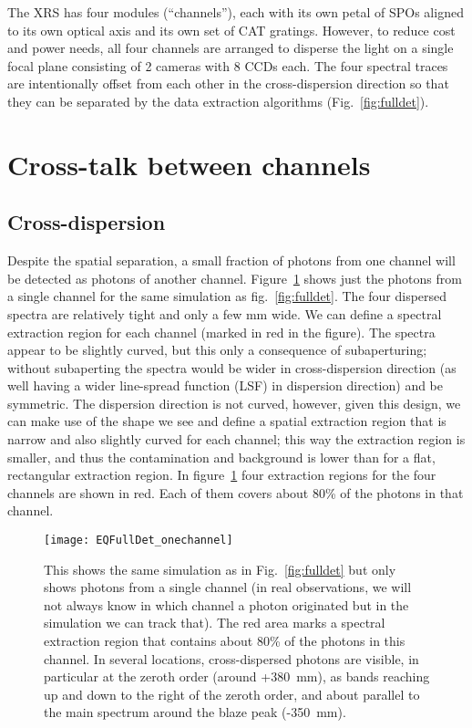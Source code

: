 \documentclass[12pt]{spieman}  %
\begin{document}
\begin{spacing}{2}
The XRS has four modules (``channels''), each with its own petal of SPOs aligned to its own optical axis and its own set of CAT gratings. However, to reduce cost and power needs, all four channels are arranged to disperse the light on a single focal plane consisting of 2 cameras with 8 CCDs each. The four spectral traces are intentionally offset from each other in the cross-dispersion direction so that they can be separated by the data extraction algorithms (Fig.~\ref{fig:fulldet}).

\section{Cross-talk between channels}
\label{sect:crosstalk}

\subsection{Cross-dispersion}
Despite the spatial separation, a small fraction of photons from one channel will be detected as photons of another channel. Figure~\ref{fig:onechannel} shows just the photons from a single channel for the same simulation as fig.~\ref{fig:fulldet}.
The four dispersed spectra are relatively tight and only a few mm wide. We can define a spectral extraction region for each channel (marked in red in the figure). The spectra appear to be slightly curved, but this only a consequence of subaperturing; without subaperting the spectra would be wider in cross-dispersion direction (as well having a wider line-spread function (LSF) in dispersion direction) and be symmetric. The dispersion direction is not curved, however, given this design, we can make use of the shape we see and define a spatial extraction region that is narrow and also slightly curved for each channel; this way the extraction region is smaller, and thus the contamination and background is lower than for a flat, rectangular extraction region. In figure~\ref{fig:onechannel} four extraction regions for the four channels are shown in red. Each of them covers about 80\% of the photons in that channel.

\begin{figure}
    \centering
    \texttt{[image: EQFullDet\_onechannel]}
    \caption {\label{fig:onechannel}
    This shows the same simulation as in Fig.~\ref{fig:fulldet} but only shows photons from a single channel (in real observations, we will not always know in which channel a photon originated but in the simulation we can track that). The red area marks a spectral extraction region that contains about 80\% of the photons in this channel. In several locations, cross-dispersed photons are visible, in particular at the zeroth order (around +380~mm), as bands reaching up and down to the right of the zeroth order, and about parallel to the main spectrum around the blaze peak (-350~mm).
}
\end{figure}


\end{spacing}
\end{document}
